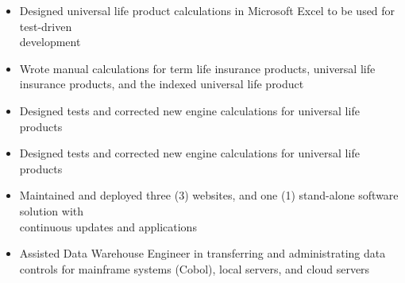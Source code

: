 
\ExperienceExpanded
{\begin{itemize}
    \item Designed universal life product calculations in Microsoft Excel to be used for
    test-driven \\development
    \item Wrote manual calculations for term life insurance products, universal life insurance
    products, and the indexed universal life product
    \item Designed tests and corrected new engine calculations for universal life products
    \item Designed tests and corrected new engine calculations for universal life products
    \item Maintained and deployed three (3) websites, and one (1) stand-alone software solution
    with \\continuous updates and applications
    \item Assisted Data Warehouse Engineer in transferring and administrating data controls for
    mainframe systems (Cobol), local servers, and cloud servers
\end{itemize}}